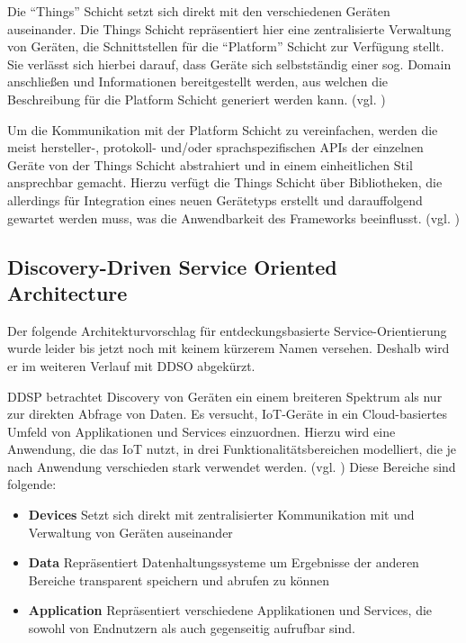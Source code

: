 \documentclass[conference,compsoc]{IEEEtran}
\begin{document}
Die \enquote{Things} Schicht setzt sich direkt mit den verschiedenen Geräten auseinander. Die Things Schicht repräsentiert hier eine zentralisierte Verwaltung von Geräten, die Schnittstellen für die \enquote{Platform} Schicht zur Verfügung stellt. Sie verlässt sich hierbei darauf, dass Geräte sich selbstständig einer sog. Domain anschließen und Informationen bereitgestellt werden, aus welchen die Beschreibung für die Platform Schicht generiert werden kann. (vgl. \cite{simurgh})

Um die Kommunikation mit der Platform Schicht zu vereinfachen, werden die meist hersteller-, protokoll- und/oder sprachspezifischen APIs der einzelnen Geräte von der Things Schicht abstrahiert und in einem einheitlichen Stil ansprechbar gemacht. Hierzu verfügt die Things Schicht über Bibliotheken, die allerdings für Integration eines neuen Gerätetyps erstellt und darauffolgend gewartet werden muss, was die Anwendbarkeit des Frameworks beeinflusst. (vgl. \cite{simurgh}) 

\subsection{Discovery-Driven Service Oriented Architecture}
Der folgende Architekturvorschlag für entdeckungsbasierte Service-Orientierung wurde leider bis jetzt noch mit keinem kürzerem Namen versehen. Deshalb wird er im weiteren Verlauf mit DDSO abgekürzt.

DDSP betrachtet Discovery von Geräten ein einem breiteren Spektrum als nur zur direkten Abfrage von Daten. Es versucht, IoT-Geräte in ein Cloud-basiertes Umfeld von Applikationen und Services einzuordnen. Hierzu wird eine Anwendung, die das IoT nutzt, in drei Funktionalitätsbereichen modelliert, die je nach Anwendung verschieden stark verwendet werden. (vgl. \cite{DDSO}) Diese Bereiche sind folgende:

\begin{itemize}
\item \textbf{Devices} Setzt sich direkt mit zentralisierter Kommunikation mit und  Verwaltung von Geräten auseinander
\item \textbf{Data} Repräsentiert Datenhaltungssysteme um Ergebnisse der anderen Bereiche transparent speichern und abrufen zu können
\item \textbf{Application} Repräsentiert verschiedene Applikationen und Services, die sowohl von Endnutzern als auch gegenseitig aufrufbar sind.
\end{itemize}
\end{document}
